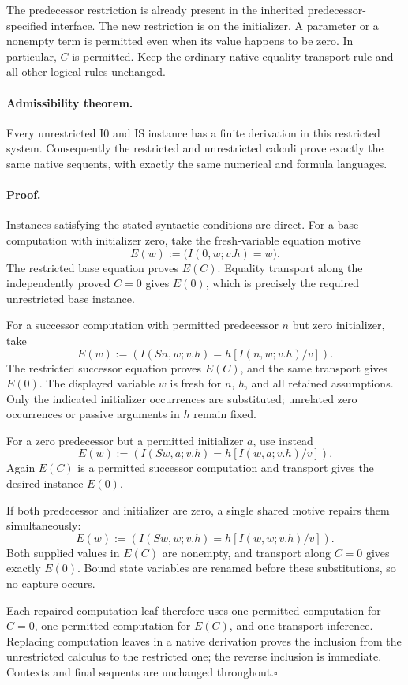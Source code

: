 The predecessor restriction is already present in the inherited
predecessor-specified interface.  The new restriction is on the
initializer.  A parameter or a nonempty term is permitted even when its
value happens to be zero.  In particular, $C$ is permitted.  Keep the
ordinary native equality-transport rule and all other logical rules
unchanged.

\paragraph{Admissibility theorem.}
Every unrestricted I0 and IS instance has a finite derivation in this
restricted system.  Consequently the restricted and unrestricted
calculi prove exactly the same native sequents, with exactly the same
numerical and formula languages.

\paragraph{Proof.}
Instances satisfying the stated syntactic conditions are direct.
For a base computation with initializer zero, take the fresh-variable
equation motive
\[
                  E(w):=\bigl(I(0,w;v.h)=w\bigr).
\]
The restricted base equation proves $E(C)$.  Equality transport along
the independently proved $C=0$ gives $E(0)$, which is precisely the
required unrestricted base instance.

For a successor computation with permitted predecessor $n$ but zero
initializer, take
\[
 E(w):=\left(I(Sn,w;v.h)=h[I(n,w;v.h)/v]\right).
\]
The restricted successor equation proves $E(C)$, and the same transport
gives $E(0)$.  The displayed variable $w$ is fresh for $n$, $h$, and all
retained assumptions.  Only the indicated initializer occurrences are
substituted; unrelated zero occurrences or passive arguments in $h$
remain fixed.

For a zero predecessor but a permitted initializer $a$, use instead
\[
 E(w):=\left(I(Sw,a;v.h)=h[I(w,a;v.h)/v]\right).
\]
Again $E(C)$ is a permitted successor computation and transport gives
the desired instance $E(0)$.

If both predecessor and initializer are zero, a single shared motive
repairs them simultaneously:
\[
 E(w):=\left(I(Sw,w;v.h)=h[I(w,w;v.h)/v]\right).
\]
Both supplied values in $E(C)$ are nonempty, and transport along $C=0$
gives exactly $E(0)$.  Bound state variables are renamed before these
substitutions, so no capture occurs.

Each repaired computation leaf therefore uses one permitted computation
for $C=0$, one permitted computation for $E(C)$, and one transport
inference.  Replacing computation leaves in a native derivation proves
the inclusion from the unrestricted calculus to the restricted one;
the reverse inclusion is immediate.  Contexts and final sequents are
unchanged throughout.\hfill$\square$

